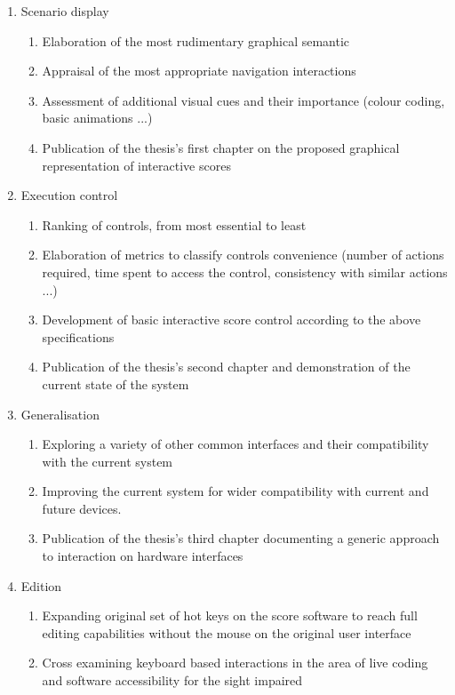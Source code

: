 \documentclass[journal,onecolumn]{IEEEtran}
\begin{document}
\begin{enumerate}
    \item Scenario display
    \begin{enumerate}
        \item Elaboration of the most rudimentary graphical semantic
        \item Appraisal of the most appropriate navigation interactions
        \item Assessment of additional visual cues and their importance (colour coding, basic animations ...)
        \item Publication of the thesis's first chapter on the proposed graphical representation of interactive scores
    \end{enumerate}
    \item Execution control
    \begin{enumerate}
        \item Ranking of controls, from most essential to least
        \item Elaboration of metrics to classify controls convenience (number of actions required, time spent to access the control, consistency with similar actions ...)
        \item Development of basic interactive score control according to the above specifications
        \item Publication of the thesis's second chapter and demonstration of the current state of the system
    \end{enumerate}
    \item Generalisation
    \begin{enumerate}
        \item Exploring a variety of other common interfaces and their compatibility with the current system
        \item Improving the current system for wider compatibility with current and future devices.
        \item Publication of the thesis's third chapter documenting a generic approach to interaction on hardware interfaces
    \end{enumerate}
    \item Edition
    \begin{enumerate}
        \item Expanding original set of hot keys on the score software to reach full editing capabilities without the mouse on the original user interface
        \item Cross examining keyboard based interactions in the area of live coding and software accessibility for the sight impaired

\end{enumerate}
\end{enumerate}
\end{document}
